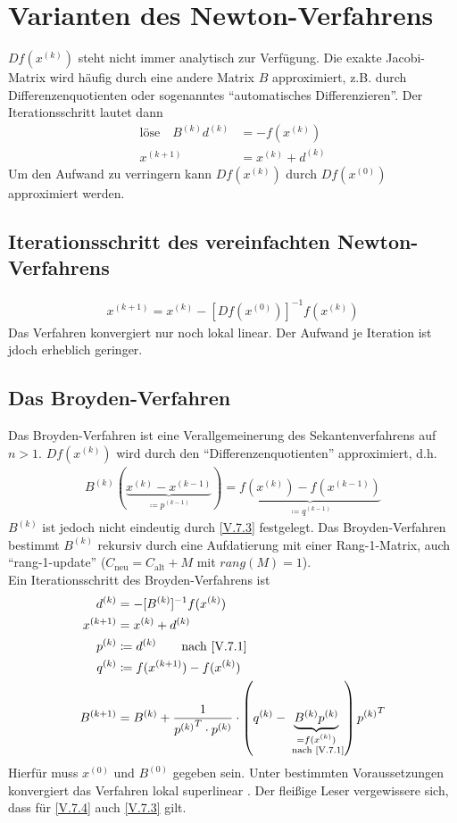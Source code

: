 \documentclass[ngerman,fontsize=11pt, paper=a4, parskip=half, titlepage=true, toc=bib]{scrbook}
\theoremstyle{definition}
\theoremstyle{plain}
\newcommand{\sectione}[1]{ \setcounter{equation}{0}\section{#1}}
\newcommand{\subsectione}[1]{\addtocounter{Def}{1}\subsection{#1}}
\begin{document}
\sectione{Varianten des Newton-Verfahrens}
$Df(x^{(k)})$ steht nicht immer analytisch zur Verfügung.
Die exakte Jacobi-Matrix wird häufig durch eine andere Matrix $B$ approximiert, 
z.B. durch Differenzenquotienten oder sogenanntes
\enquote{automatisches Differenzieren}.
Der Iterationsschritt lautet dann
\begin{align}
  \text{löse}\quad B^{(k)}d^{(k)} &= -f(x^{(k)}) 
                                    \label{V.7.1} \\\nonumber
  x^{(k+1)} &=x^{(k)} + d^{(k)}
\end{align}
Um den Aufwand zu verringern kann $Df(x^{(k)})$ durch
$Df(x^{(0)})$ approximiert werden.


\subsectione{Iterationsschritt des vereinfachten Newton-Verfahrens}
\begin{gather}
  x^{(k+1)} = x^{(k)} -[Df(x^{(0)})]^{-1} f(x^{(k)})
  \label{V.7.2}
\end{gather}
Das Verfahren konvergiert nur noch lokal linear.
Der Aufwand je Iteration ist jdoch erheblich geringer.



\subsectione{Das Broyden-Verfahren}
Das Broyden-Verfahren ist eine Verallgemeinerung des Sekantenverfahrens
auf $n>1$. $Df(x^{(k)})$ wird durch den
\enquote{Differenzenquotienten} approximiert, d.h.
\begin{gather}
  B^{(k)}(\underbrace{x^{(k)}-x^{(k-1)}}_{\coloneqq p^{(k-1)}})
  = \underbrace{f(x^{(k)})-f(x^{(k-1)})}_{\coloneqq
    q^{(k-1)}}
  \label{V.7.3}
\end{gather}
$B^{(k)}$ ist jedoch nicht eindeutig durch \eqref{V.7.3} festgelegt.
Das Broyden-Verfahren bestimmt $B^{(k)}$ rekursiv durch eine 
Aufdatierung mit einer Rang-1-Matrix, auch \enquote{rang-1-update}
($C_\text{neu} = C_\text{alt} +M$ mit $rang(M)=1$). \\

Ein Iterationsschritt des Broyden-Verfahrens ist 
\begin{align}\nonumber
  d^{(k)} &= -[B^{(k)}]^{-1} f(x^{(k)}) \\\nonumber
  x^{(k+1)} &= x^{(k)} + d^{(k)} \\\nonumber
  p^{(k)} & \coloneqq d^{(k)} \qquad \text{nach
            \eqref{V.7.1}}\\\nonumber
  q^{(k)} & \coloneqq f(x^{(k+1)})-f(x^{(k)}) \\
  B^{(k+1)} & = B^{(k)} + \frac{1}{{p^{(k)}}^T\cdot p^{(k)}}
              \cdot \left(q^{(k)}-
              \underbrace{B^{(k)}p^{(k)}}_{\substack{=f(x^{(k)})\\
  \text{ nach \eqref{V.7.1}}}}
  \right){p^{(k)}}^T
  \label{V.7.4}
\end{align}
Hierfür muss $x^{(0)} $ und $B^{(0)}$ gegeben sein.
Unter bestimmten Voraussetzungen konvergiert das Verfahren lokal
superlinear \cite[siehe][dortige Referenzen]{stoerbulirsch}.
Der fleißige Leser vergewissere sich, dass für
\eqref{V.7.4} auch \eqref{V.7.3} gilt.
\end{document}
